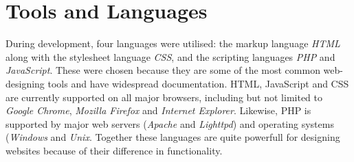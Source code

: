 \chapter{Tools and Languages}

During development, four languages were utilised: the markup language \emph{HTML} along with the stylesheet language \emph{CSS}, and the scripting languages \emph{PHP} and \emph{JavaScript}. These were chosen because they are some of the most common web-designing tools and have widespread documentation. HTML, JavaScript and CSS are currently supported on all major browsers, including but not limited to \emph{Google Chrome}, \emph{Mozilla Firefox} and \emph{Internet Explorer}. Likewise, PHP is supported by major web servers (\emph{Apache} and \emph{Lighttpd}) and operating systems (\emph{Windows} and \emph{Unix}.
Together these languages are quite powerfull for designing websites because of their difference in functionality.
\label{implementation_tools_languages}
